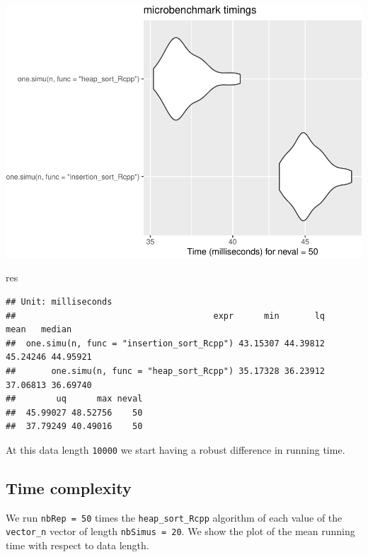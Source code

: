 \documentclass[
]{article}
\newenvironment{Shaded}{\begin{snugshade}}{\end{snugshade}}
\newcommand{\NormalTok}[1]{#1}
\begin{document}
\includegraphics{Sorting_analyse_files/figure-latex/unnamed-chunk-12-1.pdf}

\begin{Shaded}
\begin{Highlighting}[]
\NormalTok{res}
\end{Highlighting}
\end{Shaded}

\begin{verbatim}
## Unit: milliseconds
##                                       expr      min       lq     mean   median
##  one.simu(n, func = "insertion_sort_Rcpp") 43.15307 44.39812 45.24246 44.95921
##       one.simu(n, func = "heap_sort_Rcpp") 35.17328 36.23912 37.06813 36.69740
##        uq      max neval
##  45.99027 48.52756    50
##  37.79249 40.49016    50
\end{verbatim}

At this data length \texttt{10000} we start having a robust difference
in running time.

\subsection{Time complexity}\label{time-complexity}

We run \texttt{nbRep\ =\ 50} times the \texttt{heap\_sort\_Rcpp}
algorithm of each value of the \texttt{vector\_n} vector of length
\texttt{nbSimus\ =\ 20}. We show the plot of the mean running time with
respect to data length.
\end{document}
